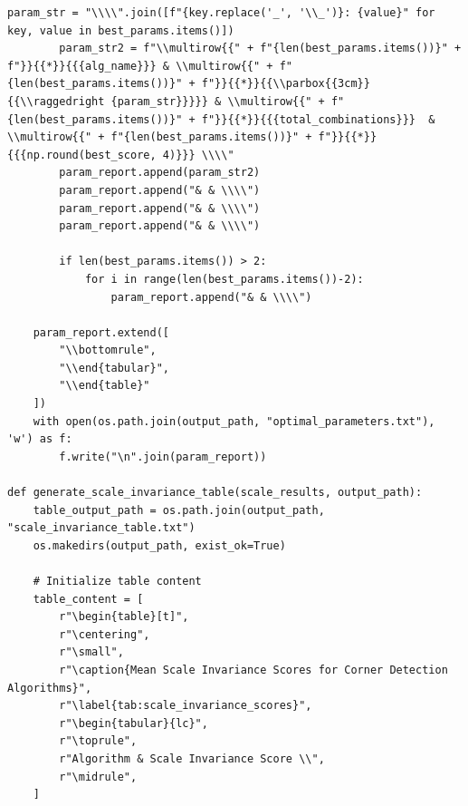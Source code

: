 \documentclass[journal]{IEEEtran}
\begin{document}
\begin{lstlisting}[style=python, caption={Utility Functions for Data Processing}, label={lst:utilities}]
        param_str = "\\\\".join([f"{key.replace('_', '\\_')}: {value}" for key, value in best_params.items()])
        param_str2 = f"\\multirow{{" + f"{len(best_params.items())}" + f"}}{{*}}{{{alg_name}}} & \\multirow{{" + f"{len(best_params.items())}" + f"}}{{*}}{{\\parbox{{3cm}}{{\\raggedright {param_str}}}}} & \\multirow{{" + f"{len(best_params.items())}" + f"}}{{*}}{{{total_combinations}}}  & \\multirow{{" + f"{len(best_params.items())}" + f"}}{{*}}{{{np.round(best_score, 4)}}} \\\\"
        param_report.append(param_str2)
        param_report.append("& & \\\\")
        param_report.append("& & \\\\")
        param_report.append("& & \\\\")
        
        if len(best_params.items()) > 2:
            for i in range(len(best_params.items())-2):
                param_report.append("& & \\\\")
                    
    param_report.extend([
        "\\bottomrule",
        "\\end{tabular}",
        "\\end{table}"
    ]) 
    with open(os.path.join(output_path, "optimal_parameters.txt"), 'w') as f:
        f.write("\n".join(param_report))
        
def generate_scale_invariance_table(scale_results, output_path):
    table_output_path = os.path.join(output_path, "scale_invariance_table.txt")
    os.makedirs(output_path, exist_ok=True)
    
    # Initialize table content
    table_content = [
        r"\begin{table}[t]",
        r"\centering",
        r"\small",
        r"\caption{Mean Scale Invariance Scores for Corner Detection Algorithms}",
        r"\label{tab:scale_invariance_scores}",
        r"\begin{tabular}{lc}",
        r"\toprule",
        r"Algorithm & Scale Invariance Score \\",
        r"\midrule",
    ]
    

\end{lstlisting}
\end{document}

